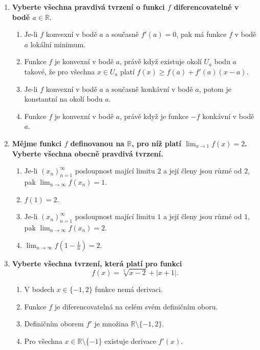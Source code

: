 \documentclass{article}
\begin{document}
\begin{enumerate}
    \pagebreak
    \item \textbf{Vyberte všechna pravdivá tvrzení o funkci $f$ diferencovatelné v bodě $a \in \mathbb{R}$}.
    \begin{enumerate}
        \item Je-li $f$ konvexní v bodě $a$ a současně $f'(a) = 0$, pak má funkce $f$ v bodě $a$ lokální minimum.
        \item Funkce $f$ je konvexní v bodě $a$, právě když existuje okolí $U_a$ bodu $a$ takové, že pro všechna $x \in U_a$ platí $f(x) \geq f(a) + f'(a)(x-a)$.
        \item Je-li $f$ konvexní v bodě $a$ a současně konkávní v bodě $a$, potom je konstantní na okolí bodu $a$.
        \item Funkce $f$ je konvexní v bodě $a$, právě když je funkce $-f$ konkávní v bodě $a$.
    \end{enumerate}

    \item \textbf{Mějme funkci $f$ definovanou na $\mathbb{R}$, pro níž platí $\lim_{x \to 1}f(x) = 2$. Vyberte všechna obecně pravdivá tvrzení.}
    \begin{enumerate}
        \item Je-li $(x_n)_{n=1}^\infty$ posloupnost mající limitu $2$ a její členy jsou různé od $2$, pak $\lim_{n \to \infty}f(x_n) = 1$.
        \item $f(1) = 2$.
        \item Je-li $(x_n)_{n=1}^\infty$ posloupnost mající limitu $1$ a její členy jsou různé od $1$, pak $\lim_{n \to \infty}f(x_n) = 2$.
        \item $\lim_{n \to \infty}f(1 - \frac{1}{n}) = 2$.
    \end{enumerate}

    \item \textbf{Vyberte všechna tvrzení, která platí pro funkci $$f(x) = \sqrt[5]{x-2} + |x+1|.$$}
    \begin{enumerate}
        \item V bodech $x \in \{-1,2\}$ funkce nemá derivaci.
        \item Funkce $f$ je diferencovatelná na celém svém definičním oboru.
        \item Definičním oborem $f'$ je množina $\mathbb{R} \setminus \{-1,2\}$.
        \item Pro všechna $x \in \mathbb{R} \setminus \{-1\}$ existuje derivace $f'(x)$.
    \end{enumerate}
    

\end{enumerate}
\end{document}
